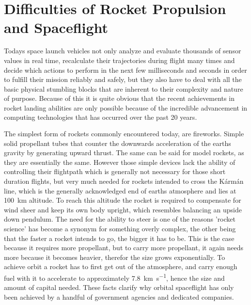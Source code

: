 \section{Difficulties of Rocket Propulsion and Spaceflight}

Todays space launch vehicles not only analyze and evaluate thousands of sensor values in real time, recalculate their trajectories during flight many times and decide which actions to perform in the next few milliseconds and seconds in order to fulfill their mission reliably and safely, but they also have to deal with all the basic physical stumbling blocks that are inherent to their complexity and nature of purpose. Because of this it is quite obvious that the recent achievements in rocket landing abilities are only possible because of the incredible advancement in computing technologies that has occurred over the past 20 years. 

The simplest form of rockets commonly encountered today, are fireworks. Simple solid propellant tubes that counter the downwards acceleration of the earths gravity by generating upward thrust. The same can be said for model rockets, as they are essentially the same. However those simple devices lack the ability of controlling their flightpath which is generally not necessary for those short duration flights, but very much needed for rockets intended to cross the Kármán line, which is the generally acknowledged end of earths atmosphere and lies at \SI{100}{\kilo\meter} altitude. To reach this altitude the rocket is required to compensate for wind sheer and keep its own body upright, which resembles balancing an upside down pendulum. The need for the ability to steer is one of the reasons 'rocket science' has become a synonym for something overly complex, the other being that the faster a rocket intends to go, the bigger it has to be. This is the case because it requires more propellant, but to carry more propellant, it again needs more because it becomes heavier, therefor the size grows exponentially. To achieve orbit a rocket has to first get out of the atmosphere, and carry enough fuel with it to accelerate to approximately \SI{7.8}{\kilo\meter\per\second}, hence the size and amount of capital needed. These facts clarify why orbital spaceflight has only been achieved by a handful of government agencies and dedicated companies.


